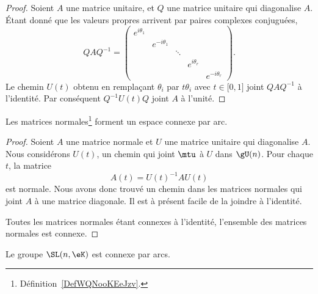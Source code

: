 \begin{proof}
	Soient \( A\) une matrice unitaire, et \( Q\) une matrice unitaire qui diagonalise \( A\). Étant donné que les valeurs propres arrivent par paires complexes conjuguées,
	\begin{equation}
		QAQ^{-1}=\begin{pmatrix}
			e^{i\theta_1} &                &        &               &                \\
			              & e^{-i\theta_1} &        &               &                \\
			              &                & \ddots &               &                \\
			              &                &        & e^{i\theta_r} &                \\
			              &                &        &               & e^{-i\theta_r}
		\end{pmatrix}.
	\end{equation}
	Le chemin \( U(t)\) obtenu en remplaçant \( \theta_i\) par \( t\theta_i\) avec \( t\in\mathopen[ 0 , 1 \mathclose]\) joint \( QAQ^{-1}\) à l'identité. Par conséquent \( Q^{-1}U(t)Q\) joint \( A\) à l'unité.
\end{proof}


\begin{theorem}
	Les matrices normales\footnote{Définition~\ref{DefWQNooKEeJzv}.} forment un espace connexe par arc.
\end{theorem}

\begin{proof}
	Soient \( A\) une matrice normale et \( U\) une matrice unitaire qui diagonalise \( A\). Nous considérons \( U(t)\), un chemin qui joint \( \mtu\) à \( U\) dans \( \gU(n)\). Pour chaque \( t\), la matrice
	\begin{equation}
		A(t)=U(t)^{-1} AU(t)
	\end{equation}
	est normale. Nous avons donc trouvé un chemin dans les matrices normales qui joint \( A\) à une matrice diagonale. Il est à présent facile de la joindre à l'identité.

	Toutes les matrices normales étant connexes à l'identité, l'ensemble des matrices normales est connexe.
\end{proof}

\begin{proposition}     \label{PROPooALQCooLZCKrH}
	Le groupe \( \SL(n,\eK)\) est connexe par arcs.
\end{proposition}

